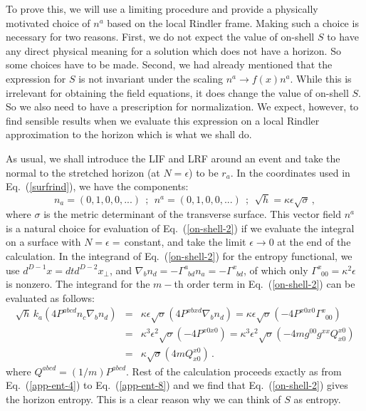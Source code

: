 \documentclass[12pt]{iopart}
\def\eq#1{{Eq.~(\ref{#1})}}
\newcommand{\ph}[1]{\phantom{#1}}
\newcommand{\D}{\ensuremath{\nabla}}
\begin{document}
 To prove  this, we will  use a limiting procedure and provide
a physically motivated choice of $n^a$ based on  the local Rindler frame. Making such a choice is necessary for two reasons. First, we do not expect the value of on-shell $S$ to have any direct physical meaning for a solution which does not have a horizon. So some choices have to be made. Second, we had already mentioned that the expression for $S$ is not invariant under the scaling $n^a\to f(x)n^a$. While this is irrelevant for obtaining the field equations, it does change the value of on-shell $S$. So we also need to have a prescription for normalization. We expect, however, to find sensible results when we evaluate this expression on a local Rindler approximation to the horizon which is what we shall do.

As usual, we shall introduce the LIF and LRF around an event and take  the normal to the stretched horizon (at $N=\epsilon$) to be $r_a$. In the coordinates used in \eq{surfrind}, we have the components:
\begin{equation} 
n_a=(0,1,0,0,...) ~~;~~ n^a=(0,1,0,0,...)
~~;~~ \sqrt{h}=\kappa \epsilon\sqrt{\sigma}\,,
\label{app-ent-1}
\end{equation}
where $\sigma$ is the metric determinant of the transverse  surface. This vector field $n^a$ is a natural choice for
evaluation of \eq{on-shell-2} if we evaluate the  integral on a surface with
$N=\epsilon=\,$constant, and take the limit $\epsilon\to 0$ at the end of the calculation. 
  In the integrand of \eq{on-shell-2} for the entropy functional, 
   we use
   $d^{D-1}x=dtd^{D-2}x_\perp$, and $\D_bn_d =
-\Gamma^a_{\ph{a}bd}n_a = -\Gamma^x_{\ph{a}bd}$, of which
only $\Gamma^x_{\ph{a}00}=\kappa^2\epsilon$ is nonzero. 
 The integrand for the $m-$th order term  in \eq{on-shell-2} can be
evaluated as follows:  
\begin{eqnarray}
\sqrt{h}\,k_a\left(4P^{abcd}n_c\D_bn_d\right) &=&
\kappa\epsilon\sqrt{\sigma}\left(4P^{x bx d}\D_bn_d\right)
=\kappa\epsilon\sqrt{\sigma}\left(
-4P^{x 0x 0}\Gamma^x_{\ph{a}00}\right) \nonumber\\
&=&\kappa^3\epsilon^2\sqrt{\sigma}\left(-4P^{x 0x 0}\right)
= \kappa^3\epsilon^2\sqrt{\sigma}\left(-4 m g^{00}g^{xx}
Q_{x 0}^{x 0}\right) \nonumber\\
&=& \kappa\sqrt{\sigma}\left(4 m Q_{x 0}^{x 0}\right)\,.
\label{app-ent-3}
\end{eqnarray}
where $Q^{abcd} = (1/m) P^{abcd}$.
Rest of the calculation proceeds exactly as from \eq{app-ent-4} to \eq{app-ent-8}  and we  find that \eq{on-shell-2} gives the horizon entropy.
This is a clear reason why we can think of $S$ as entropy.
\end{document}
